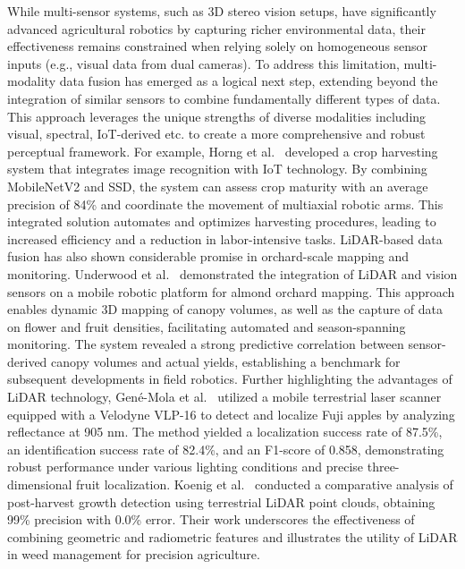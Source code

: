 \documentclass{ieeeaccess}
\begin{document}
While multi-sensor systems, such as 3D stereo vision setups, have significantly advanced agricultural robotics by capturing richer environmental data, their effectiveness remains constrained when relying solely on homogeneous sensor inputs (e.g., visual data from dual cameras). To address this limitation, multi-modality data fusion has emerged as a logical next step, extending beyond the integration of similar sensors to combine fundamentally different types of data. This approach leverages the unique strengths of diverse modalities including visual, spectral, IoT-derived etc. to create a more comprehensive and robust perceptual framework.
For example, Horng et al.~\cite{horng2019smart} developed a crop harvesting system that integrates image recognition with IoT technology. By combining MobileNetV2 and SSD, the system can assess crop maturity with an average precision of 84\% and coordinate the movement of multiaxial robotic arms. This integrated solution automates and optimizes harvesting procedures, leading to increased efficiency and a reduction in labor-intensive tasks.
LiDAR-based data fusion has also shown considerable promise in orchard-scale mapping and monitoring. Underwood et al.~\cite{underwood2016mapping} demonstrated the integration of LiDAR and vision sensors on a mobile robotic platform for almond orchard mapping. This approach enables dynamic 3D mapping of canopy volumes, as well as the capture of data on flower and fruit densities, facilitating automated and season-spanning monitoring. The system revealed a strong predictive correlation between sensor-derived canopy volumes and actual yields, establishing a benchmark for subsequent developments in field robotics.
Further highlighting the advantages of LiDAR technology, Gené-Mola et al.~\cite{gene2019fruit} utilized a mobile terrestrial laser scanner equipped with a Velodyne VLP-16 to detect and localize Fuji apples by analyzing reflectance at 905 nm. The method yielded a localization success rate of 87.5\%, an identification success rate of 82.4\%, and an F1-score of 0.858, demonstrating robust performance under various lighting conditions and precise three-dimensional fruit localization. Koenig et al.~\cite{koenig2015comparative} conducted a comparative analysis of post-harvest growth detection using terrestrial LiDAR point clouds, obtaining 99\% precision with 0.0\% error. Their work underscores the effectiveness of combining geometric and radiometric features and illustrates the utility of LiDAR in weed management for precision agriculture.
\end{document}
